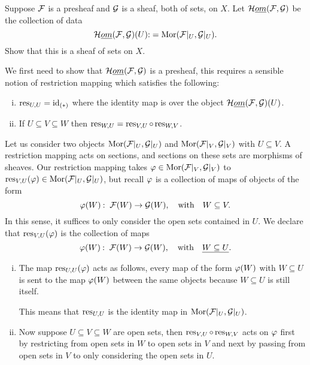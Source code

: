 \documentclass[12pt]{memoir}
\begin{document}

\begin{Ej}[2.3.C. Vakil]
   Suppose $\mathcal{F}$ is a presheaf and $\mathcal{G}$ is a sheaf, both of sets, on $X$. Let $\mathcal{H}\emph{om}(\mathcal{F},\mathcal{G})$ be the collection of data 
   $$\mathcal{H}\emph{om}(\mathcal{F},\mathcal{G})(U)\mathbin{:}=\operatorname{Mor}(\mathcal{F}|_U,\mathcal{G}|_U).$$
   Show that this is a sheaf of sets on $X$. 
\end{Ej}
\begin{ptcbr}
    We first need to show that $\mathcal{H}\emph{om}(\mathcal{F},\mathcal{G})$ is a presheaf, this requires a sensible notion of restriction mapping which satisfies the following:
    \begin{enumerate}[i)]
        \itemsep=-0.4em
        \item $\operatorname*{res}_{U,U}=\operatorname{id}_{(\ast)}$ where the identity map is over the object $\mathcal{H}\emph{om}(\mathcal{F},\mathcal{G})(U)$.
        \item If $U\subseteq V\subseteq W$ then $\operatorname*{res}_{W,U}=\operatorname*{res}_{V,U}\circ\operatorname*{res}_{W,V}$.
    \end{enumerate}
    Let us consider two objects $\operatorname{Mor}(\mathcal{F}|_U,\mathcal{G}|_U)$ and $\operatorname{Mor}(\mathcal{F}|_V,\mathcal{G}|_V)$ with $U\subseteq V$. A restriction mapping acts on sections, and sections on these sets are morphisms of sheaves. Our restriction mapping takes $\varphi\in\operatorname{Mor}(\mathcal{F}|_V,\mathcal{G}|_V)$ to $\operatorname*{res}_{V,U}(\varphi)\in\operatorname{Mor}(\mathcal{F}|_U,\mathcal{G}|_U)$, but recall $\varphi$ is a collection of maps of objects of the form 
    $$\vf(W)\:\ \cF(W)\to\cG(W),\word{with}W\subseteq V.$$
    In this sense, it suffices to only consider the open sets contained in $U$. We declare that $\operatorname*{res}_{V,U}(\varphi)$ is the collection of maps 
    $$\vf(W)\:\ \cF(W)\to\cG(W),\word{with}\un{W\subseteq U}.$$
    \begin{enumerate}[i)]
        \itemsep=-0.4em
        \item The map $\operatorname*{res}_{U,U}(\varphi)$ acts as follows, every map of the form $\varphi(W)$ with $W\subseteq U$ is sent to the map $\varphi(W)$ between the same objects because $W\subseteq U$ is still itself.\par 
        This means that $\operatorname*{res}_{U,U}$ is the identity map in $\operatorname{Mor}(\mathcal{F}|_U,\mathcal{G}|_U)$.
        \item Now suppose $U\subseteq V\subseteq W$ are open sets, then $\operatorname*{res}_{V,U}\circ\operatorname*{res}_{W,V}$ acts on $\varphi$ first by restricting from open sets in $W$ to open sets in $V$ and next by passing from open sets in $V$ to only considering the open sets in $U$.\par

\end{enumerate}
\end{ptcbr}
\end{document}
